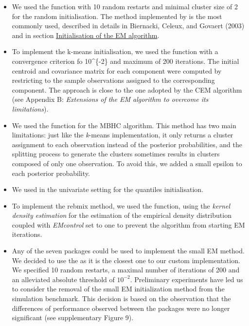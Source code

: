 \begin{itemize}
\item
  We used the function  with 10 random restarts and minimal cluster size of 2 for the random initialisation. The method implemented by  is the most commonly used, described in details in Biernacki, Celeux, and Govaert (2003) and in section \protect\hyperlink{initialisation-of-the-em-algorithm}{Initialisation of the EM algorithm}.
\item
  To implement the k-means initialisation, we used the  function with a convergence criterion fo 10\^{}\{-2\} and maximum of 200 iterations. The initial centroid and covariance matrix for each component were computed by restricting to the sample observations assigned to the corresponding component. The approach is close to the one adopted by the CEM algorithm (see Appendix B: \emph{Extensions of the EM algorithm to overcome its limitations}).
\item
  We used the  function for the MBHC algorithm. This method has two main limitations: just like the \emph{k}-means implementation, it only returns a cluster assignment to each observation instead of the posterior probabilities, and the splitting process to generate the clusters sometimes results in clusters composed of only one observation. To avoid this, we added a small epsilon to each posterior probability.
\item
  We used in the univariate setting  for the quantiles initialisation.
\item
  To implement the rebmix method, we used the  function, using the \emph{kernel density estimation} for the estimation of the empirical density distribution coupled with \emph{EMcontrol} set to one to prevent the algorithm from starting EM iterations.
\item
  Any of the seven packages could be used to implement the small EM method. We decided to use the  as it is the closest one to our custom implementation. We specified 10 random restarts, a maximal number of iterations of 200 and an alleviated absolute threshold of \(10^{-2}\). Preliminary experiments have led us to consider the removal of the small EM initialization method from the simulation benchmark. This decision is based on the observation that the differences of performance observed between the packages were no longer significant (see supplementary Figure 9).
\end{itemize}

